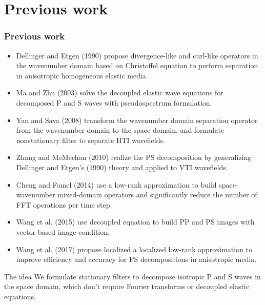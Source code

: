 \documentclass[aspectratio=43]{beamer}
\begin{document}
\section{Previous work}
\begin{frame}
  \frametitle{Previous work}
\tiny{
\begin{itemize}
\item{Dellinger and Etgen (1990) propose divergence-like and curl-like operators in the wavenumber domain based on Christoffel equation to perform separation in anisotropic homogeneous elastic media.}
\item{Ma and Zhu (2003) solve the decoupled elastic wave equations for decomposed P and S waves with pseudospectrum formulation.}
\item{Yan and Sava (2008) transform the wavenumber domain separation operator from the wavenumber domain to the space domain, and formulate nonstationary filter to separate HTI wavefields.}
\item{Zhang and McMechan (2010) realize the PS decomposition by generalizing Dellinger and Etgen's (1990) theory and applied to VTI wavefields.}
\item{Cheng and Fomel (2014) use a low-rank approximation to build space-wavenumber mixed-domain operators and significantly reduce the number of FFT operations per time step.}
\item{Wang et al. (2015) use decoupled equation to build PP and PS images with vector-based image condition.} 
\item{Wang et al. (2017) propose localized a localized low-rank approximation to improve efficiency and accuracy for PS decompositions in anisotropic media.}  
\end{itemize}
}
\end{frame}
\begin{frame}{The idea}
We formulate stationary filters to decompose isotropic P and S waves in the space domain, which don't require Fourier transforms or decoupled elastic equations.
\end{frame}
\end{document}
